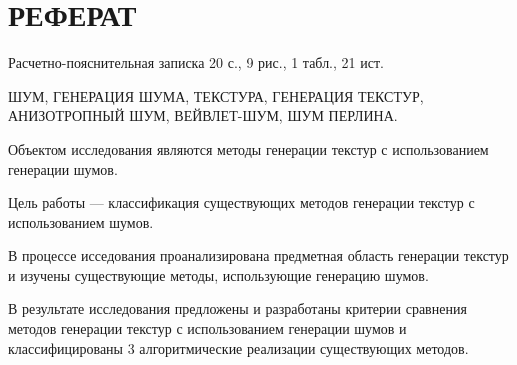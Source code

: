 \chapter*{РЕФЕРАТ}

Расчетно-пояснительная записка 20 с., 9 рис., 1 табл., 21 ист.

ШУМ, ГЕНЕРАЦИЯ ШУМА, ТЕКСТУРА, ГЕНЕРАЦИЯ ТЕКСТУР, АНИЗОТРОПНЫЙ ШУМ, ВЕЙВЛЕТ-ШУМ, ШУМ ПЕРЛИНА.

Объектом исследования являются методы генерации текстур с использованием генерации шумов.

Цель работы --- классификация существующих методов генерации текстур с использованием шумов.

В процессе исседования проанализирована предметная область генерации текстур и изучены существующие методы, использующие генерацию шумов.

В результате исследования предложены и разработаны критерии сравнения методов генерации текстур с использованием генерации шумов и классифицированы 3 алгоритмические реализации существующих методов.